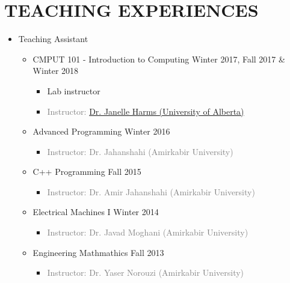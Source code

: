 \vspace{-2em}
\section{TEACHING EXPERIENCES}
\begin{itemize}
	\item Teaching Assistant
	\begin{itemize}
	
		\item {} CMPUT 101 - Introduction to Computing \hfill Winter 2017, Fall 2017 \& Winter 2018
		\begin{itemize} 
			\item Lab instructor
			
			\item\textcolor{gray}{Instructor: \href{https://webdocs.cs.ualberta.ca/~harms/}{Dr. Janelle Harms (University of Alberta)}}
		\end{itemize}
			
		\item {} Advanced Programming \hfill Winter 2016
		\begin{itemize} 
			\item\textcolor{gray}{Instructor: Dr. Jahanshahi (Amirkabir University)}
		\end{itemize}
		
		\item {} C++ Programming \hfill Fall 2015
		\begin{itemize} 
			\item \textcolor{gray}{Instructor: Dr. Amir Jahanshahi (Amirkabir University)}
		\end{itemize}
		
		\item {} Electrical Machines I \hfill Winter 2014
		\begin{itemize} 
			\item \textcolor{gray}{Instructor: Dr. Javad Moghani (Amirkabir University)}
		\end{itemize}
		
		\item {} Engineering Mathmathics \hfill Fall 2013
		\begin{itemize} 
			\item\textcolor{gray}{Instructor: Dr. Yaser Norouzi (Amirkabir University)} 
		\end{itemize}
	
	\end{itemize}
\end{itemize}

